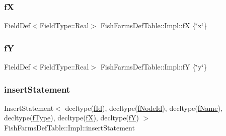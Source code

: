 \subsubsection{\texorpdfstring{fX}{fX}}
{\footnotesize\ttfamily Field\+Def$<$Field\+Type\+::\+Real$>$ Fish\+Farms\+Def\+Table\+::\+Impl\+::fX \{\char`\"{}x\char`\"{}\}}

\mbox{\label{struct_fish_farms_def_table_1_1_impl_a7922671ffef246d44ed2c9fb4efd719d}} 
\subsubsection{\texorpdfstring{fY}{fY}}
{\footnotesize\ttfamily Field\+Def$<$Field\+Type\+::\+Real$>$ Fish\+Farms\+Def\+Table\+::\+Impl\+::fY \{\char`\"{}y\char`\"{}\}}

\mbox{\label{struct_fish_farms_def_table_1_1_impl_aa17a01820d262320ff37a82eefb77c47}} 
\subsubsection{\texorpdfstring{insertStatement}{insertStatement}}
{\footnotesize\ttfamily Insert\+Statement$<$ decltype(\mbox{\hyperlink{struct_fish_farms_def_table_1_1_impl_ae3eeaefb826965d54a6ebf27696a67c0}{f\+Id}}), decltype(\mbox{\hyperlink{struct_fish_farms_def_table_1_1_impl_acc9e1ce4f57803601bbf172bb6499207}{f\+Node\+Id}}), decltype(\mbox{\hyperlink{struct_fish_farms_def_table_1_1_impl_ad8cb7e9d96f8c73c705563c9c4537b1e}{f\+Name}}), decltype(\mbox{\hyperlink{struct_fish_farms_def_table_1_1_impl_a25df08564e817f991ab732f2e84af021}{f\+Type}}), decltype(\mbox{\hyperlink{struct_fish_farms_def_table_1_1_impl_a74ecffa210908377879c244444116dab}{fX}}), decltype(\mbox{\hyperlink{struct_fish_farms_def_table_1_1_impl_a7922671ffef246d44ed2c9fb4efd719d}{fY}}) $>$ Fish\+Farms\+Def\+Table\+::\+Impl\+::insert\+Statement}

\mbox{\label{struct_fish_farms_def_table_1_1_impl_aa544513374ceff01b8ce2ce1098b3f81}} 
